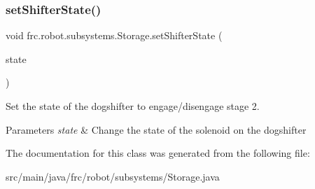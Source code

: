 \subsubsection{\texorpdfstring{setShifterState()}{setShifterState()}}
{\footnotesize\ttfamily void frc.\+robot.\+subsystems.\+Storage.\+set\+Shifter\+State (\begin{DoxyParamCaption}\item[{\mbox{\hyperlink{enumfrc_1_1robot_1_1enums_1_1_solenoid_state}{Solenoid\+State}}}]{state }\end{DoxyParamCaption})\hspace{0.3cm}{\ttfamily [inline]}}



Set the state of the dogshifter to engage/disengage stage 2. 


\begin{DoxyParams}{Parameters}
{\em state} & Change the state of the solenoid on the dogshifter \\
\hline
\end{DoxyParams}


The documentation for this class was generated from the following file\+:\begin{DoxyCompactItemize}
\item 
src/main/java/frc/robot/subsystems/Storage.\+java\end{DoxyCompactItemize}
